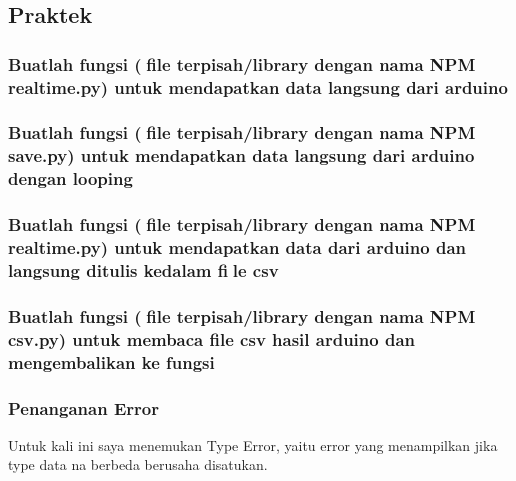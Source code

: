 \subsection{Praktek}
\subsubsection{Buatlah fungsi (file terpisah/library dengan nama NPM realtime.py) untuk mendapatkan data langsung dari arduino}


\subsubsection{Buatlah fungsi (file terpisah/library dengan nama NPM save.py) untuk mendapatkan data langsung dari arduino dengan looping}


\subsubsection{Buatlah fungsi (file terpisah/library dengan nama NPM realtime.py) untuk mendapatkan data dari arduino dan langsung ditulis kedalam file csv}


\subsubsection{Buatlah fungsi (file terpisah/library dengan nama NPM csv.py) untuk membaca file csv hasil arduino dan mengembalikan ke fungsi}


\subsubsection{Penanganan Error}
Untuk kali ini saya menemukan Type Error, yaitu error yang menampilkan jika type data na berbeda berusaha disatukan.


